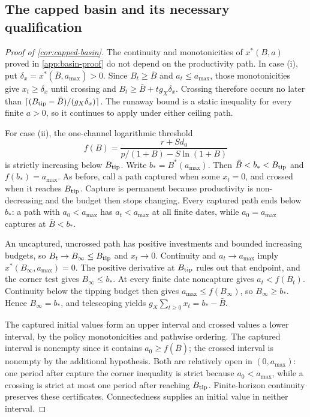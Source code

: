 \documentclass[11pt,a4paper]{article}
\theoremstyle{definition}\newtheorem{definition}{Definition}
\begin{document}
\subsection{The capped basin and its necessary qualification}
\label{app:capped-basin-proof}
\begin{proof}[Proof of \cref{cor:capped-basin}]
The continuity and monotonicities of $x^*(B,a)$ proved in
\cref{app:basin-proof} do not depend on the productivity path.
In case (i), put $\delta_x=x^*(\bar B,a_{\max})>0$.
Since $B_t\geq\bar B$ and $a_t\leq a_{\max}$, those monotonicities give
$x_t\geq\delta_x$ until crossing and
$B_t\geq\bar B+t g_X\delta_x$. Crossing therefore occurs no later than
$\lceil(B_{\rm tip}-\bar B)/(g_X\delta_x)\rceil$.
The runaway bound is a static inequality for every finite $a>0$, so it
continues to apply under either ceiling path.

For case (ii), the one-channel logarithmic threshold
\[
 f(B)=\frac{r+Sd_0}{p/(1+B)-S\ln(1+B)}
\]
is strictly increasing below $B_{\rm tip}$. Write $b_*=B^*(a_{\max})$.
Then $\bar B<b_*<B_{\rm tip}$ and $f(b_*)=a_{\max}$.
As before, call a path captured when some $x_t=0$, and crossed when it
reaches $B_{\rm tip}$. Capture is permanent because productivity is
non-decreasing and the budget then stops changing. Every captured path
ends below $b_*$: a path with $a_0<a_{\max}$ has $a_t<a_{\max}$ at
all finite dates, while $a_0=a_{\max}$ captures at $\bar B<b_*$.

An uncaptured, uncrossed path has positive investments and bounded
increasing budgets, so $B_t\to B_\infty\leq B_{\rm tip}$ and $x_t\to0$.
Continuity and $a_t\to a_{\max}$ imply
$x^*(B_\infty,a_{\max})=0$. The positive derivative at $B_{\rm tip}$
rules out that endpoint, and the corner test gives $B_\infty\leq b_*$.
At every finite date noncapture gives $a_t<f(B_t)$. Continuity below
the tipping budget then gives $a_{\max}\leq f(B_\infty)$, so
$B_\infty\geq b_*$. Hence $B_\infty=b_*$, and telescoping yields
$g_X\sum_{t\geq0}x_t=b_*-\bar B$.

The captured initial values form an upper interval and crossed values a
lower interval, by the policy monotonicities and pathwise ordering.
The captured interval is nonempty since it contains $a_0\geq f(\bar B)$;
the crossed interval is nonempty by the additional hypothesis. Both are
relatively open in $(0,a_{\max})$: one period after capture the corner
inequality is strict because $a_0<a_{\max}$, while a crossing is strict
at most one period after reaching $B_{\rm tip}$. Finite-horizon
continuity preserves these certificates. Connectedness supplies an initial
value in neither interval.


\end{proof}
\end{document}
